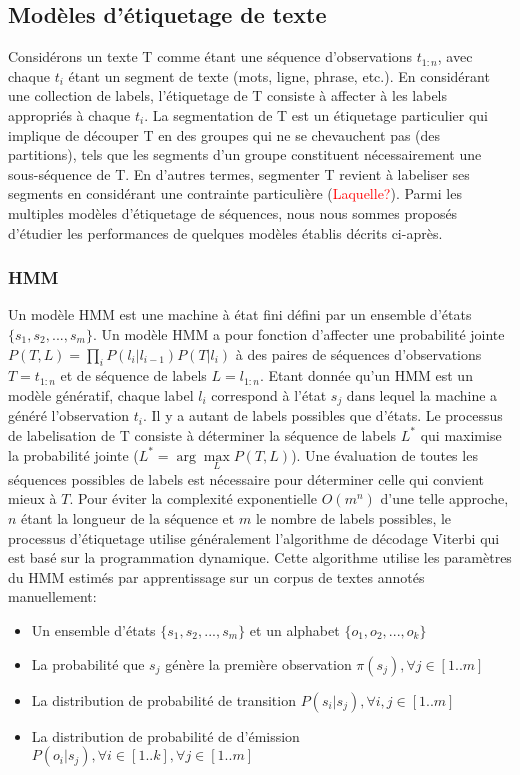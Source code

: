 \subsection{Modèles d'étiquetage de texte}

Considérons un texte T comme étant une séquence d'observations $t_{1:n}$, avec chaque $t_i$ étant un segment de texte (mots, ligne, phrase, etc.). En considérant une collection de labels, l'étiquetage de T consiste à affecter à les labels appropriés à chaque $t_i$. La segmentation de T est un étiquetage particulier qui implique de découper T en des groupes qui ne se chevauchent pas (des partitions), tels que les segments d'un groupe constituent nécessairement une sous-séquence de T. En d'autres termes, segmenter T revient à labeliser ses segments en considérant une contrainte particulière (\textcolor{red}{Laquelle?}). Parmi les multiples modèles d'étiquetage de séquences, nous nous sommes proposés d'étudier les performances de quelques modèles établis décrits ci-après.
\subsubsection{HMM}
Un modèle HMM est une machine à état fini défini par un ensemble d'états $ \lbrace s_1, s_2, ..., s_m \rbrace $. Un modèle HMM a pour fonction d'affecter une probabilité jointe 
$ P (T , L) = \prod\limits_i P(l_i \vert l_{i-1})P(T \vert l_i)$  à des paires de séquences d'observations $ T = t_{1: n} $ et de séquence de labels $ L = l_{1:n} $. Etant donnée qu'un HMM est un modèle génératif, chaque label $l_i$ correspond à l'état $s_j$ dans lequel la machine a généré l'observation $t_i$. Il y a autant de labels possibles que d'états. Le processus de labelisation de T consiste à déterminer la séquence de labels $ L^* $ qui maximise la probabilité jointe ($L^* = \arg \max\limits_L P(T, L)$). Une évaluation de toutes les séquences possibles de labels est nécessaire pour déterminer celle qui convient mieux à $ T $. Pour éviter la complexité exponentielle $ O(m^n)$ d'une telle approche, $n$ étant la longueur de la séquence et $m$ le nombre de labels possibles, le processus d'étiquetage utilise généralement l'algorithme de décodage Viterbi \citep{viterbi1967viterbi} qui est basé sur la programmation dynamique. Cette algorithme utilise les paramètres du HMM estimés par apprentissage sur un corpus de textes annotés manuellement:
\begin{itemize}
\item Un ensemble d'états $ \lbrace s_1, s_2, ..., s_m \rbrace $ et un alphabet $ \lbrace o_1, o_2, ..., o_k \rbrace $
\item La probabilité que $ s_j $ génère la première observation $ \pi(s_j), \forall j \in [1 .. m] $
\item La distribution de probabilité de transition $ P (s_i\vert s_j),  \forall i,j \in [1 .. m] $
\item La distribution de probabilité de d'émission $ P(o_i\vert s_j), \forall i \in [1 .. k], \forall j \in [1 .. m]$
\end{itemize}

